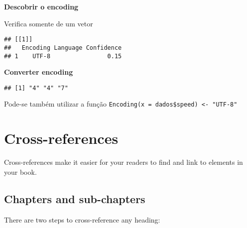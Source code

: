 \documentclass[
]{book}
\newenvironment{Shaded}{\begin{snugshade}}{\end{snugshade}}
\newcommand{\AttributeTok}[1]{\textcolor[rgb]{0.77,0.63,0.00}{#1}}
\newcommand{\CommentTok}[1]{\textcolor[rgb]{0.56,0.35,0.01}{\textit{#1}}}
\newcommand{\DecValTok}[1]{\textcolor[rgb]{0.00,0.00,0.81}{#1}}
\newcommand{\FunctionTok}[1]{\textcolor[rgb]{0.00,0.00,0.00}{#1}}
\newcommand{\NormalTok}[1]{#1}
\newcommand{\SpecialCharTok}[1]{\textcolor[rgb]{0.00,0.00,0.00}{#1}}
\newcommand{\StringTok}[1]{\textcolor[rgb]{0.31,0.60,0.02}{#1}}
\theoremstyle{definition}
\theoremstyle{definition}
\theoremstyle{definition}
\theoremstyle{definition}
\theoremstyle{remark}
\begin{document}
\textbf{Descobrir o encoding}

Verifica somente de um vetor

\begin{Shaded}
\end{Shaded}

\begin{verbatim}
## [[1]]
##   Encoding Language Confidence
## 1    UTF-8                0.15
\end{verbatim}

\textbf{Converter encoding}

\begin{Shaded}
\end{Shaded}

\begin{verbatim}
## [1] "4" "4" "7"
\end{verbatim}

Pode-se também utilizar a função \texttt{Encoding(x\ =\ dados\$speed)\ \textless{}-\ "UTF-8"}

\hypertarget{cross}{%
\chapter{Cross-references}\label{cross}}

Cross-references make it easier for your readers to find and link to elements in your book.

\hypertarget{chapters-and-sub-chapters}{%
\section{Chapters and sub-chapters}\label{chapters-and-sub-chapters}}

There are two steps to cross-reference any heading:
\end{document}
